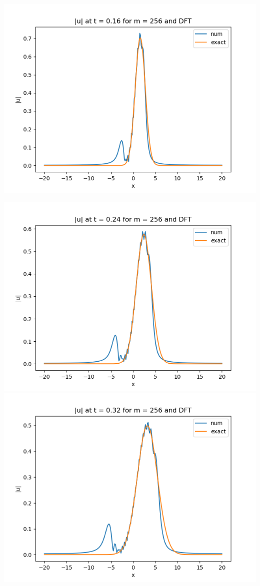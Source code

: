 \documentclass{article}
\begin{document}
\begin{enumerate}[label=(\alph*)]
\begin{center}
	\includegraphics[scale=.3]{FINAL u_abs t = 0.16 m = 256 DFT}
\end{center}
\begin{center}
	\includegraphics[scale=.3]{FINAL u_abs t = 0.24 m = 256 DFT}
	\includegraphics[scale=.3]{FINAL u_abs t = 0.32 m = 256 DFT}

\end{center}
\end{enumerate}
\end{document}
